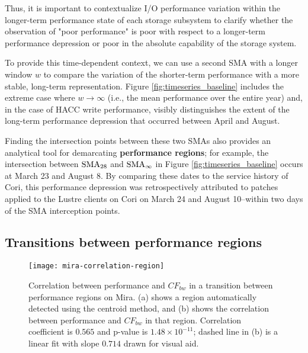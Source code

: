 Thus, it is important to contextualize I/O performance variation within the longer-term performance state of each storage subsystem to clarify whether the observation of "poor performance" is poor with respect to a longer-term performance depression or poor in the absolute capability of the storage system.

To provide this time-dependent context, we can use a second SMA with a longer window $w$ to compare the variation of the shorter-term performance with a more stable, long-term representation.  Figure \ref{fig:timeseries_baseline} includes the extreme case where ${w \rightarrow \infty}$ (i.e., the mean performance over the entire year) and, in the case of HACC write performance, visibly distinguishes the extent of the long-term performance depression that occurred between April and August.

Finding the intersection points between these two SMAs also provides an analytical tool for demarcating \textbf{performance regions};
for example, the intersection between $\textup{SMA}_{28}$ and $\textup{SMA}_\infty$ in Figure \ref{fig:timeseries_baseline} occurs at March 23 and August 8.
By comparing these dates to the service history of Cori, this performance depression was retrospectively attributed to patches applied to the Lustre clients on Cori on March 24 and August 10--within two days of the SMA interception points.







\subsection{Transitions between performance regions} \label{sec:features/transitions}

\begin{figure}[t]
    \centering
    \texttt{[image: mira-correlation-region]}
    \vspace{-.35in}
    \caption{Correlation between performance and $CF_{bw}$ in a transition between performance regions on Mira. (a) shows a region automatically detected using the centroid method, and (b) shows the correlation between performance and $CF_{bw}$ in that region.  Correlation coefficient is $0.565$ and p-value is ${1.48 \times 10^{-11}}$; dashed line in (b) is a linear fit with slope $0.714$ drawn for visual aid.}
    \label{fig:mira-correlation-region}
\end{figure}

